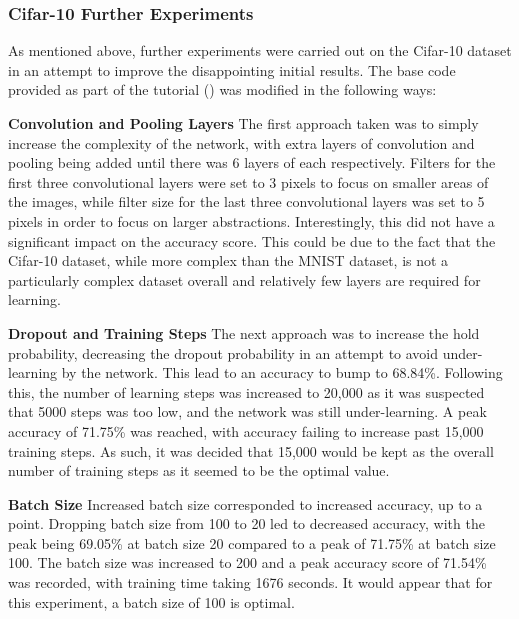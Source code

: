 \documentclass[12pt]{report}
\begin{document}
\subsubsection{Cifar-10 Further Experiments}
\begin{flushleft}
As mentioned above, further experiments were carried out on the Cifar-10 dataset in an attempt to improve the disappointing initial results. The base code provided as part of the tutorial (\cite{udemy}) was modified in the following ways:

\vspace{0.5cm}
\textbf{Convolution and Pooling Layers}
\linebreak
The first approach taken was to simply increase the complexity of the network, with extra layers of convolution and pooling being added until there was 6 layers of each respectively. Filters for the first three convolutional layers were set to 3 pixels to focus on smaller areas of the images, while filter size for the last three convolutional layers was set to 5 pixels in order to focus on larger abstractions. Interestingly, this did not have a significant impact on the accuracy score. This could be due to the fact that the Cifar-10 dataset, while more complex than the MNIST dataset, is not a particularly complex dataset overall and relatively few layers are required for learning.

\vspace{0.5cm}
\textbf{Dropout and Training Steps}
\linebreak
The next approach was to increase the hold probability, decreasing the dropout probability in an attempt to avoid under-learning by the network. This lead to an accuracy to bump to 68.84\%. Following this, the number of learning steps was increased to 20,000 as it was suspected that 5000 steps was too low, and the network was still under-learning. A peak accuracy of 71.75\% was reached, with accuracy failing to increase past 15,000 training steps. As such, it was decided that 15,000 would be kept as the overall number of training steps as it seemed to be the optimal value.

\vspace{0.5cm}
\textbf{Batch Size}
\linebreak
Increased batch size corresponded to increased accuracy, up to a point. Dropping batch size from 100 to 20 led to decreased accuracy, with the peak being 69.05\% at batch size 20 compared to a peak of 71.75\% at batch size 100. The batch size was increased to 200 and a peak accuracy score of 71.54\% was recorded, with training time taking 1676 seconds. It would appear that for this experiment, a batch size of 100 is optimal.



\end{flushleft}
\end{document}
